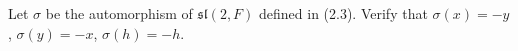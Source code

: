 Let $\sigma$ be the automorphism of $\mathfrak{sl}(2, F)$ defined in (2.3). Verify that $\sigma(x) = -y$, $\sigma(y) = -x$, $\sigma(h) = -h$.
